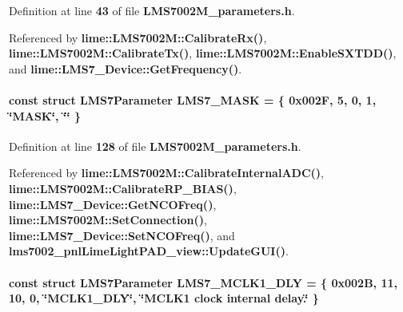 Definition at line {\bf 43} of file {\bf L\+M\+S7002\+M\+\_\+parameters.\+h}.



Referenced by {\bf lime\+::\+L\+M\+S7002\+M\+::\+Calibrate\+Rx()}, {\bf lime\+::\+L\+M\+S7002\+M\+::\+Calibrate\+Tx()}, {\bf lime\+::\+L\+M\+S7002\+M\+::\+Enable\+S\+X\+T\+D\+D()}, and {\bf lime\+::\+L\+M\+S7\+\_\+\+Device\+::\+Get\+Frequency()}.

\paragraph[{L\+M\+S7\+\_\+\+M\+A\+SK}]{\setlength{\rightskip}{0pt plus 5cm}const struct {\bf L\+M\+S7\+Parameter} L\+M\+S7\+\_\+\+M\+A\+SK = \{ 0x002\+F, 5, 0, 1, \char`\"{}\+M\+A\+S\+K\char`\"{}, \char`\"{}\char`\"{} \}\hspace{0.3cm}{\ttfamily [static]}}\label{LMS7002M__parameters_8h_a3aa3a044afda19da46417d9799b32648}


Definition at line {\bf 128} of file {\bf L\+M\+S7002\+M\+\_\+parameters.\+h}.



Referenced by {\bf lime\+::\+L\+M\+S7002\+M\+::\+Calibrate\+Internal\+A\+D\+C()}, {\bf lime\+::\+L\+M\+S7002\+M\+::\+Calibrate\+R\+P\+\_\+\+B\+I\+A\+S()}, {\bf lime\+::\+L\+M\+S7\+\_\+\+Device\+::\+Get\+N\+C\+O\+Freq()}, {\bf lime\+::\+L\+M\+S7002\+M\+::\+Set\+Connection()}, {\bf lime\+::\+L\+M\+S7\+\_\+\+Device\+::\+Set\+N\+C\+O\+Freq()}, and {\bf lms7002\+\_\+pnl\+Lime\+Light\+P\+A\+D\+\_\+view\+::\+Update\+G\+U\+I()}.

\paragraph[{L\+M\+S7\+\_\+\+M\+C\+L\+K1\+\_\+\+D\+LY}]{\setlength{\rightskip}{0pt plus 5cm}const struct {\bf L\+M\+S7\+Parameter} L\+M\+S7\+\_\+\+M\+C\+L\+K1\+\_\+\+D\+LY = \{ 0x002\+B, 11, 10, 0, \char`\"{}\+M\+C\+L\+K1\+\_\+\+D\+L\+Y\char`\"{}, \char`\"{}\+M\+C\+L\+K1 clock internal delay.\char`\"{} \}\hspace{0.3cm}{\ttfamily [static]}}\label{LMS7002M__parameters_8h_a640edb57a5dd0a34865ff55148705ece}



